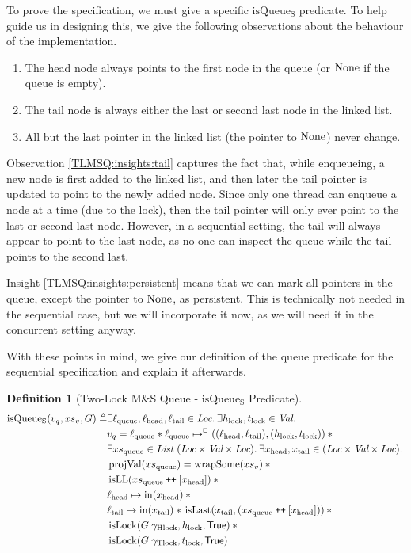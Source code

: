 \documentclass[a4paper, 10pt]{report}
\theoremstyle{definition}
\newtheorem{definition}{Definition}[section]
\newcommand{\isLock}{\operatorname{isLock}}
\newcommand{\msq}{M\&S Queue}
\newcommand{\tlmsq}{Two-Lock \msq{}}
\newcommand{\isqueueseq}{\operatorname{isQueue_{S}}}
\newcommand{\vq}{v_q}
\newcommand{\xsqueue}{xs_{\mathrm{queue}}}
\newcommand{\isLL}{\operatorname{isLL}}
\newcommand{\projval}{\operatorname{projVal}}
\newcommand{\wrapsome}{\operatorname{wrapSome}}
\newcommand{\isLast}{\operatorname{isLast}}
\newcommand{\locN}[1]{\loc_{\mathrm{#1}}}
\newcommand{\lochead}{\locN{head}}
\newcommand{\loctail}{\locN{tail}}
\newcommand{\locqueue}{\locN{queue}}
\newcommand{\nIn}[1]{\operatorname{in}(#1)}
\newcommand{\node}{x}
\newcommand{\nodeN}[1]{\node_{\mathrm{#1}}}
\newcommand{\nodehead}{\nodeN{head}}
\newcommand{\nodetail}{\nodeN{tail}}
\newcommand{\absvalueList}{xs_v}
\newcommand{\Hlock}{h_{\mathrm{lock}}}
\newcommand{\Tlock}{t_{\mathrm{lock}}}
\newcommand{\Qg}{G}
\newcommand{\ghlock}{\gname_{\mathrm{Hlock}}}
\newcommand{\gtlock}{\gname_{\mathrm{Tlock}}}
\newcommand\catenate{\mathbin{\text{\ttfamily\upshape ++}}}
\begin{document}
To prove the specification, we must give a specific $\isqueueseq$ predicate. To help guide us in designing this, we give the following observations about the behaviour of the implementation.
\begin{enumerate}
  \item\label{TLMSQ:insights:head} The head node always points to the first node in the queue (or $\operatorname{None}$ if the queue is empty).
  \item\label{TLMSQ:insights:tail} The tail node is always either the last or second last node in the linked list.
  \item\label{TLMSQ:insights:persistent} All but the last pointer in the linked list (the pointer to $\operatorname{None}$) never change.
\end{enumerate}

Observation \ref{TLMSQ:insights:tail} captures the fact that, while enqueueing, a new node is first added to the linked list, and then later the tail pointer is updated to point to the newly added node. Since only one thread can enqueue a node at a time (due to the lock), then the tail pointer will only ever point to the last or second last node. However, in a sequential setting, the tail will always appear to point to the last node, as no one can inspect the queue while the tail points to the second last.

Insight \ref{TLMSQ:insights:persistent} means that we can mark all pointers in the queue, except the pointer to $\operatorname{None}$, as persistent. This is technically not needed in the sequential case, but we will incorporate it now, as we will need it in the concurrent setting anyway.

With these points in mind, we give our definition of the queue predicate for the sequential specification and explain it afterwards.
\begin{definition}[\tlmsq{} - $\isqueueseq$ Predicate]\label{TLMSQ:spec:seq:isqueueseq}
\begin{align*}
  \isqueueseq(\vq, \absvalueList, \Qg) \eqdef
  &\Exists \locqueue, \lochead, \loctail \in \Loc . \Exists \Hlock, \Tlock \in \Val . \\
  &\vq = \locqueue \star{} \locqueue \mapsto^{\persistently} ((\lochead, \loctail), (\Hlock, \Tlock)) \star{}\\
  &\Exists \xsqueue \in \List ~ (\Loc \times \Val \times \Loc) . \Exists \nodehead, \nodetail \in (\Loc \times \Val \times \Loc) .\\
	&\projval(\xsqueue) = \wrapsome(\absvalueList) \star{}\\
	&\isLL (\xsqueue \catenate [\nodehead]) \star{}\\
	&\lochead \mapsto \nIn{\nodehead} \star{}\\
	&\loctail \mapsto \nIn{\nodetail} \star{} \isLast(\nodetail, (\xsqueue \catenate [\nodehead])) \star{}\\
	&\isLock(\Qg.\ghlock, \Hlock, \TRUE) \star{}\\
	&\isLock(\Qg.\gtlock, \Tlock, \TRUE)
\end{align*}
\end{definition}
\end{document}
